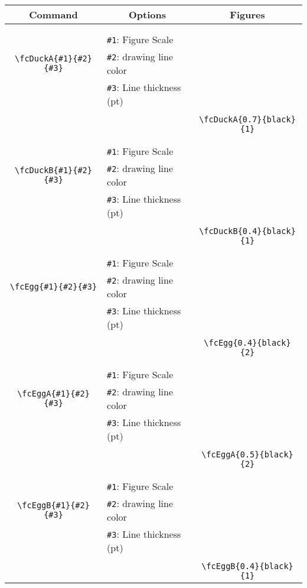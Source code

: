 \documentclass[x11names]{article}
\begin{document}
\begin{table}[H]\centering\begin{tabular}{|c|l|c|}\hline {\bf Command}& \multicolumn{1}{c|}{{\bf Options}} & {\bf Figures}\\  \hline	&&\multirow{5}{*}{\fcDuckA{0.7}{black}{1}}\\	&&\\	&\verb|#1|: Figure Scale &\\	\verb|\fcDuckA{#1}{#2}{#3}|&	\verb|#2|: drawing line color &\\	&\verb|#3|: Line thickness (pt) &\\ &&\\&&	\verb|\fcDuckA{0.7}{black}{1}|\\\hline 	
	&&\multirow{5}{*}{\fcDuckB{0.4}{black}{1}}\\	&&\\	&\verb|#1|: Figure Scale &\\	\verb|\fcDuckB{#1}{#2}{#3}|&	\verb|#2|: drawing line color &\\	&\verb|#3|: Line thickness (pt) &\\ &&\\&&	\verb|\fcDuckB{0.4}{black}{1}|\\\hline 	
	&&\multirow{5}{*}{\fcEgg{0.4}{black}{2}}\\	&&\\	&\verb|#1|: Figure Scale &\\	\verb|\fcEgg{#1}{#2}{#3}|&	\verb|#2|: drawing line color &\\	&\verb|#3|: Line thickness (pt) &\\ &&\\&&	\verb|\fcEgg{0.4}{black}{2}|\\\hline 	
	&&\multirow{5}{*}{\fcEggA{0.5}{black}{2}}\\	&&\\	&\verb|#1|: Figure Scale &\\	\verb|\fcEggA{#1}{#2}{#3}|&	\verb|#2|: drawing line color &\\	&\verb|#3|: Line thickness (pt) &\\ &&\\&&	\verb|\fcEggA{0.5}{black}{2}|\\\hline 	
	&&\multirow{5}{*}{\fcEggB{0.4}{black}{1}}\\	&&\\	&\verb|#1|: Figure Scale &\\	\verb|\fcEggB{#1}{#2}{#3}|&	\verb|#2|: drawing line color &\\	&\verb|#3|: Line thickness (pt) &\\ &&\\&&	\verb|\fcEggB{0.4}{black}{1}|\\\hline 	

\end{tabular}
\end{table}
\end{document}
